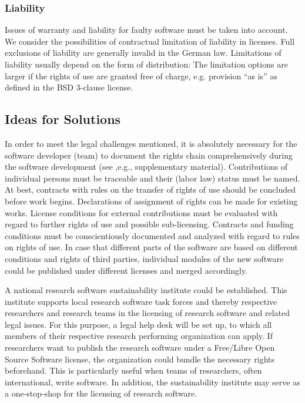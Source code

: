 \documentclass[a4paper,num-refs,numbers,sort&compress]{de-rse}
\begin{document}
\subsubsection{Liability}
Issues of warranty and liability for faulty software must be taken into account. We consider the possibilities of contractual limitation of liability in licenses. Full exclusions of liability are generally invalid in the German law. Limitations of liability usually depend on the form of distribution: The limitation options are larger if the rights of use are granted free of charge, e.g. provision ``as is'' as defined in the BSD 3-clause license.

\subsection{Ideas for Solutions}
In order to meet the legal challenges mentioned, it is absolutely necessary for the software developer (team) to document the rights chain comprehensively during the software development (see ,e.g., supplementary material). Contributions of individual persons must be traceable and their (labor law) status must be named. At best, contracts with rules on the transfer of rights of use should be concluded before work begins. Declarations of assignment of rights can be made for existing works. License conditions for external contributions must be evaluated with regard to further rights of use and possible sub-licensing. Contracts and funding conditions must be conscientiously documented and analyzed with regard to rules on rights of use. In case that different parts of the software are based on different conditions and rights of third parties, individual modules of the new software could be published under different licenses and merged accordingly.

A national research software sustainability institute could be established. This institute supports local research software task forces and thereby respective researchers and research teams in the licensing of research software and related legal issues. For this purpose, a legal help desk will be set up, to which all members of their respective research performing organization can apply. If researchers want to publish the research software under a Free/Libre Open Source Software license, the organization could bundle the necessary rights beforehand. This is particularly useful when teams of researchers, often international, write software. In addition, the sustainability institute may serve as a one-stop-shop for the licensing of research software.
\end{document}
